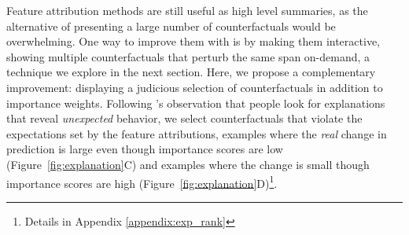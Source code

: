 Feature attribution methods are still useful as high level summaries, as the alternative of presenting a large number of counterfactuals would be overwhelming. One way to improve them with \sysname{} is by making them interactive, showing multiple counterfactuals that perturb the same span on-demand, a technique we explore in the next section. Here, we propose a complementary improvement: displaying a judicious selection of \sysname{} counterfactuals in addition to importance weights. 
Following \citet{miller}'s observation that people look for explanations that reveal \emph{unexpected} behavior, we select counterfactuals that violate the expectations set by the feature attributions, \ie examples where the \emph{real} change in prediction is large even though importance scores are low (Figure~\ref{fig:explanation}C) and examples where the change is small though importance scores are high (Figure~\ref{fig:explanation}D)\footnote{Details in Appendix \ref{appendix:exp_rank}}.







